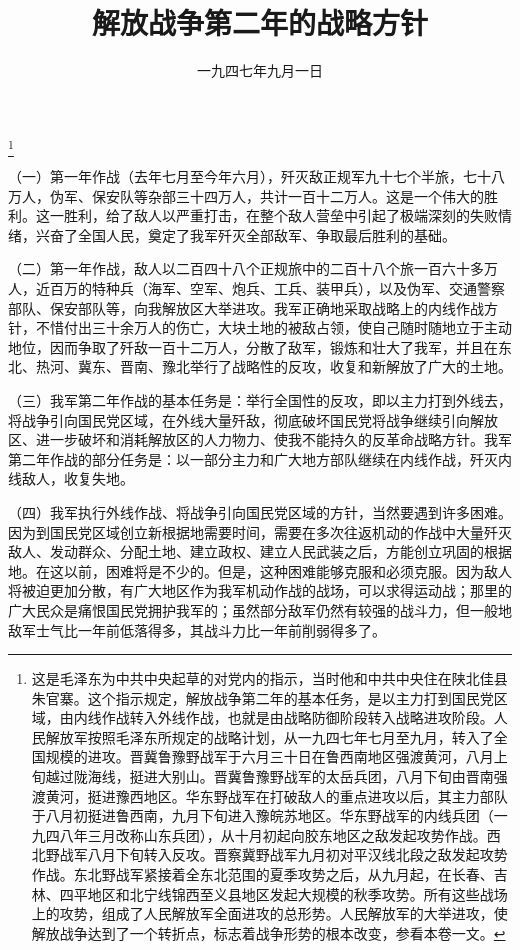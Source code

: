 
\title{解放战争第二年的战略方针}
\date{一九四七年九月一日}
\thanks{这是毛泽东为中共中央起草的对党内的指示，当时他和中共中央住在陕北佳县朱官寨。这个指示规定，解放战争第二年的基本任务，是以主力打到国民党区域，由内线作战转入外线作战，也就是由战略防御阶段转入战略进攻阶段。人民解放军按照毛泽东所规定的战略计划，从一九四七年七月至九月，转入了全国规模的进攻。晋冀鲁豫野战军于六月三十日在鲁西南地区强渡黄河，八月上旬越过陇海线，挺进大别山。晋冀鲁豫野战军的太岳兵团，八月下旬由晋南强渡黄河，挺进豫西地区。华东野战军在打破敌人的重点进攻以后，其主力部队于八月初挺进鲁西南，九月下旬进入豫皖苏地区。华东野战军的内线兵团（一九四八年三月改称山东兵团），从十月初起向胶东地区之敌发起攻势作战。西北野战军八月下旬转入反攻。晋察冀野战军九月初对平汉线北段之敌发起攻势作战。东北野战军紧接着全东北范围的夏季攻势之后，从九月起，在长春、吉林、四平地区和北宁线锦西至义县地区发起大规模的秋季攻势。所有这些战场上的攻势，组成了人民解放军全面进攻的总形势。人民解放军的大举进攻，使解放战争达到了一个转折点，标志着战争形势的根本改变，参看本卷一文。}
\maketitle


（一）第一年作战（去年七月至今年六月），歼灭敌正规军九十七个半旅，七十八万人，伪军、保安队等杂部三十四万人，共计一百十二万人。这是一个伟大的胜利。这一胜利，给了敌人以严重打击，在整个敌人营垒中引起了极端深刻的失败情绪，兴奋了全国人民，奠定了我军歼灭全部敌军、争取最后胜利的基础。

（二）第一年作战，敌人以二百四十八个正规旅中的二百十八个旅一百六十多万人，近百万的特种兵（海军、空军、炮兵、工兵、装甲兵），以及伪军、交通警察部队、保安部队等，向我解放区大举进攻。我军正确地采取战略上的内线作战方针，不惜付出三十余万人的伤亡，大块土地的被敌占领，使自己随时随地立于主动地位，因而争取了歼敌一百十二万人，分散了敌军，锻炼和壮大了我军，并且在东北、热河、冀东、晋南、豫北举行了战略性的反攻，收复和新解放了广大的土地。

（三）我军第二年作战的基本任务是：举行全国性的反攻，即以主力打到外线去，将战争引向国民党区域，在外线大量歼敌，彻底破坏国民党将战争继续引向解放区、进一步破坏和消耗解放区的人力物力、使我不能持久的反革命战略方针。我军第二年作战的部分任务是：以一部分主力和广大地方部队继续在内线作战，歼灭内线敌人，收复失地。

（四）我军执行外线作战、将战争引向国民党区域的方针，当然要遇到许多困难。因为到国民党区域创立新根据地需要时间，需要在多次往返机动的作战中大量歼灭敌人、发动群众、分配土地、建立政权、建立人民武装之后，方能创立巩固的根据地。在这以前，困难将是不少的。但是，这种困难能够克服和必须克服。因为敌人将被迫更加分散，有广大地区作为我军机动作战的战场，可以求得运动战；那里的广大民众是痛恨国民党拥护我军的；虽然部分敌军仍然有较强的战斗力，但一般地敌军士气比一年前低落得多，其战斗力比一年前削弱得多了。

